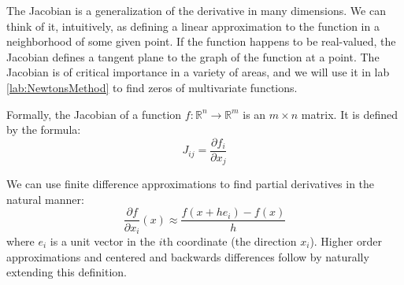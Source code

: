 \label{Ch:Multivariate Finite Difference Schemes}


The Jacobian is a generalization of the derivative in many dimensions. We can think of it, 
intuitively, as defining a linear approximation to the function in a neighborhood of some given
point. If the function happens to be real-valued, the Jacobian defines a tangent plane to the graph of 
the function at a point. 
The Jacobian is of critical importance in a variety of areas, and we will use it in lab \ref{lab:NewtonsMethod}
to find zeros of multivariate functions.

Formally, the Jacobian of a function $f:\mathbb{R}^n \rightarrow \mathbb{R}^m$ is an $m \times n$ matrix. It is defined by the formula:
\begin{equation*}
J_{ij} = \frac{\partial f_i}{\partial x_j}
\end{equation*}

We can use finite difference approximations to find partial derivatives in the natural manner:
\begin{equation*}
\frac{\partial f}{\partial x_i} (x) \approx \frac{f(x+h e_i)-f(x)}{h}
\end{equation*}
where $e_i$ is a unit vector in the $i$th coordinate (the direction $x_i$). Higher order approximations and centered and backwards differences follow by naturally extending this definition.

